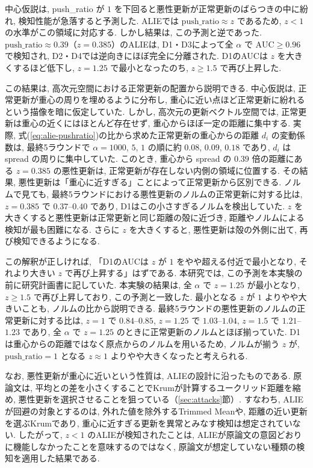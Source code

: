 \documentclass[a4j, twocolumn, dvipdfmx]{jsarticle}
\newcommand{\PushRatio}{\textrm{push\_ratio}}
\newcommand{\Spread}{\textrm{spread}}
\begin{document}
中心仮説は, \PushRatio{} が $1$ を下回ると悪性更新が正常更新のばらつきの中に紛れ, 検知性能が急落すると予測した. ALIEでは $\PushRatio \approx z$ であるため, $z<1$ の水準がこの領域に対応する. しかし結果は, この予測と逆であった. $\PushRatio \approx 0.39$（$z=0.385$）のALIEは, D1・D3によって全 $\alpha$ で $\mathrm{AUC} \ge 0.96$ で検知され, D2・D4では逆向きにほぼ完全に分離された. D1のAUCは $z$ を大きくするほど低下し, $z=1.25$ で最小となったのち, $z \ge 1.5$ で再び上昇した.

この結果は, 高次元空間における正常更新の配置から説明できる. 中心仮説は, 正常更新が重心の周りを埋めるように分布し, 重心に近い点ほど正常更新に紛れるという描像を暗に仮定していた. しかし, 高次元の更新ベクトル空間では, 正常更新は重心の近くにはほとんど存在せず, 重心からほぼ一定の距離に集中する. 実際, 式(\ref{eq:alie-pushratio})の比から求めた正常更新の重心からの距離 $d_i$ の変動係数は, 最終5ラウンドで $\alpha=1000,\,5,\,1$ の順に約 $0.08$, $0.09$, $0.18$ であり, $d_i$ は \Spread{} の周りに集中していた. このとき, 重心から \Spread{} の $0.39$ 倍の距離にある $z=0.385$ の悪性更新は, 正常更新が存在しない内側の領域に位置する. その結果, 悪性更新は「重心に近すぎる」ことによって正常更新から区別できる. ノルムで見ても, 最終5ラウンドにおける悪性更新のノルムの正常更新に対する比は, $z=0.385$ で $0.37$--$0.40$ であり, D1はこの小さすぎるノルムを検出していた. $z$ を大きくすると悪性更新は正常更新と同じ距離の殻に近づき, 距離やノルムによる検知が最も困難になる. さらに $z$ を大きくすると, 悪性更新は殻の外側に出て, 再び検知できるようになる.

この解釈が正しければ, 「D1のAUCは $z$ が $1$ をやや超える付近で最小となり, それより大きい $z$ で再び上昇する」はずである. 本研究では, この予測を本実験の前に研究計画書に記していた. 本実験の結果は, 全 $\alpha$ で $z=1.25$ が最小となり, $z \ge 1.5$ で再び上昇しており, この予測と一致した. 最小となる $z$ が $1$ よりやや大きいことも, ノルムの比から説明できる. 最終5ラウンドの悪性更新のノルムの正常更新に対する比は, $z=1$ で $0.84$--$0.85$, $z=1.25$ で $1.03$--$1.04$, $z=1.5$ で $1.21$--$1.23$ であり, 全 $\alpha$ で $z=1.25$ のときに正常更新のノルムとほぼ揃っていた. D1は重心からの距離ではなく原点からのノルムを用いるため, ノルムが揃う $z$ が, $\PushRatio=1$ となる $z \approx 1$ よりやや大きくなったと考えられる.

なお, 悪性更新が重心に近いという性質は, ALIEの設計に沿ったものである. 原論文は, 平均との差を小さくすることでKrumが計算するユークリッド距離を縮め, 悪性更新を選択させることを狙っている\cite{baruch2019little}（\ref{sec:attacks}節）. すなわち, ALIEが回避の対象とするのは, 外れた値を除外するTrimmed Meanや, 距離の近い更新を選ぶKrumであり, 重心に近すぎる更新を異常とみなす検知は想定されていない. したがって, $z<1$ のALIEが検知されたことは, ALIEが原論文の意図どおりに機能しなかったことを意味するのではなく, 原論文が想定していない種類の検知を適用した結果である.
\end{document}
